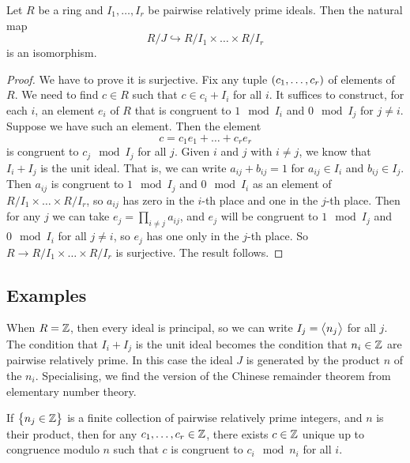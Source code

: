 \begin{theorem}
Let $ R $ be a ring and $ I_1, \dots, I_r $ be pairwise relatively prime ideals. Then the natural map
$$ R / J \hookrightarrow R / I_1 \times \dots \times R / I_r $$
is an isomorphism.
\end{theorem}

\begin{proof}
We have to prove it is surjective. Fix any tuple $ \br{c_1, \dots, c_r} $ of elements of $ R $. We need to find $ c \in R $ such that $ c \in c_i + I_i $ for all $ i $. It suffices to construct, for each $ i $, an element $ e_i $ of $ R $ that is congruent to $ 1 \mod I_i $ and $ 0 \mod I_j $ for $ j \ne i $. Suppose we have such an element. Then the element
$$ c = c_1e_1 + \dots + c_re_r $$
is congruent to $ c_j \mod I_j $ for all $ j $. Given $ i $ and $ j $ with $ i \ne j $, we know that $ I_i + I_j $ is the unit ideal. That is, we can write $ a_{ij} + b_{ij} = 1 $ for $ a_{ij} \in I_i $ and $ b_{ij} \in I_j $.  Then $ a_{ij} $ is congruent to $ 1 \mod I_j $ and $ 0 \mod I_i $ as an element of $ R / I_1 \times \dots \times R / I_r $, so $ a_{ij} $ has zero in the $ i $-th place and one in the $ j $-th place. Then for any $ j $ we can take $ e_j = \prod_{i \ne j} a_{ij} $, and $ e_j $ will be congruent to $ 1 \mod I_j $ and $ 0 \mod I_i $ for all $ j \ne i $, so $ e_j $ has one only in the $ j $-th place. So $ R \to R / I_1 \times \dots \times R / I_r $ is surjective. The result follows.
\end{proof}

\subsection{Examples}

When $ R = \mathbb{Z} $, then every ideal is principal, so we can write $ I_j = \left\langle n_j \right\rangle $ for all $ j $. The condition that $ I_i + I_j $ is the unit ideal becomes the condition that $ n_i \in \mathbb{Z} $ are pairwise relatively prime. In this case the ideal $ J $ is generated by the product $ n $ of the $ n_i $. Specialising, we find the version of the Chinese remainder theorem from elementary number theory.

\begin{theorem}
If $ \cbr{n_j \in \ZZ} $ is a finite collection of pairwise relatively prime integers, and $ n $ is their product, then for any $ c_1, \dots, c_r \in \mathbb{Z} $, there exists $ c \in \mathbb{Z} $ unique up to congruence modulo $ n $ such that $ c $ is congruent to $ c_i \mod n_i $ for all $ i $.
\end{theorem}

